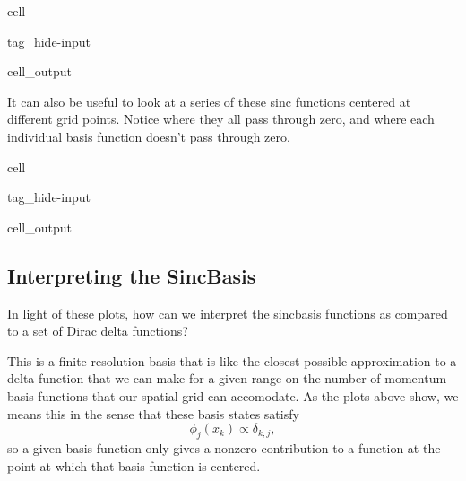 \documentclass[letterpaper,10pt,english]{jupyterBook}
\begin{document}
\begin{sphinxuseclass}{cell}
\begin{sphinxuseclass}{tag_hide-input}\begin{sphinxVerbatimOutput}

\begin{sphinxuseclass}{cell_output}
\noindent{}

\end{sphinxuseclass}\end{sphinxVerbatimOutput}

\end{sphinxuseclass}
\end{sphinxuseclass}
\sphinxAtStartPar
It can also be useful to look at a series of these sinc functions centered at different grid points. Notice where they all pass through zero, and where each individual basis function doesn’t pass through zero.

\begin{sphinxuseclass}{cell}
\begin{sphinxuseclass}{tag_hide-input}\begin{sphinxVerbatimOutput}

\begin{sphinxuseclass}{cell_output}
\noindent{}

\end{sphinxuseclass}\end{sphinxVerbatimOutput}

\end{sphinxuseclass}
\end{sphinxuseclass}

\subsection{Interpreting the Sinc\sphinxhyphen{}Basis}
\label{\detokenize{Section4_v2:interpreting-the-sinc-basis}}
\sphinxAtStartPar
{} In light of these plots, how can we interpret the sinc\sphinxhyphen{}basis functions as compared to a set of Dirac delta functions?

\sphinxAtStartPar
{} This is a finite resolution basis that is like the closest possible approximation to a delta function that we can make for a given range on the number of momentum basis functions that our spatial grid can accomodate. As the plots above show, we means this in the sense that these basis states satisfy
\label{equation:Section4_v2:cf130d56-83a6-4358-81ab-a5492c398baf}\begin{equation}
\phi_j(x_k) \propto \delta_{k,j},
\end{equation}
\sphinxAtStartPar
so a given basis function only gives a nonzero contribution to a function at the point at which that basis function is centered.
\end{document}
